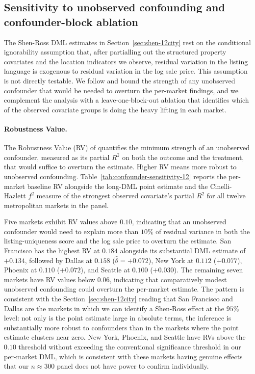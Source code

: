 
\subsection{Sensitivity to unobserved confounding and confounder-block ablation}
\label{sec:sensitivity-12}

The Shen-Ross DML estimates in Section~\ref{sec:shen-12city} rest on
the conditional ignorability assumption that, after partialling out
the structured property covariates and the location indicators we
observe, residual variation in the listing language is exogenous to
residual variation in the log sale price. This assumption is not
directly testable. We follow \citet{cinelli2020making} and bound the
strength of any unobserved confounder that would be needed to
overturn the per-market findings, and we complement the analysis with
a leave-one-block-out ablation that identifies which of the observed
covariate groups is doing the heavy lifting in each market.

\paragraph{Robustness Value.} The Robustness Value (RV) of
\citeauthor{cinelli2020making} quantifies the minimum strength of an
unobserved confounder, measured as its partial $R^2$ on both the
outcome and the treatment, that would suffice to overturn the
estimate. Higher RV means more robust to unobserved confounding.
Table~\ref{tab:confounder-sensitivity-12} reports the per-market
baseline RV alongside the long-DML point estimate and the
Cinelli-Hazlett $f^2$ measure of the strongest observed covariate's
partial $R^2$ for all twelve metropolitan markets in the panel.

Five markets exhibit RV values above $0.10$, indicating that an
unobserved confounder would need to explain more than $10\%$ of
residual variance in both the listing-uniqueness score and the log
sale price to overturn the estimate. San Francisco has the highest
RV at $0.184$ alongside its substantial DML estimate of $+0.134$,
followed by Dallas at $0.158$ ($\hat\theta = +0.072$), New York at
$0.112$ ($+0.077$), Phoenix at $0.110$ ($+0.072$), and Seattle at
$0.100$ ($+0.030$). The remaining seven markets have RV values below
$0.06$, indicating that comparatively modest unobserved confounding
could overturn the per-market estimate. The pattern is consistent
with the Section~\ref{sec:shen-12city} reading that San Francisco and
Dallas are the markets in which we can identify a Shen-Ross effect at
the $95\%$ level: not only is the point estimate large in absolute
terms, the inference is substantially more robust to confounders than
in the markets where the point estimate clusters near zero. New York,
Phoenix, and Seattle have RVs above the $0.10$ threshold without
exceeding the conventional significance threshold in our per-market
DML, which is consistent with these markets having genuine effects
that our $n \approx 300$ panel does not have power to confirm
individually.

